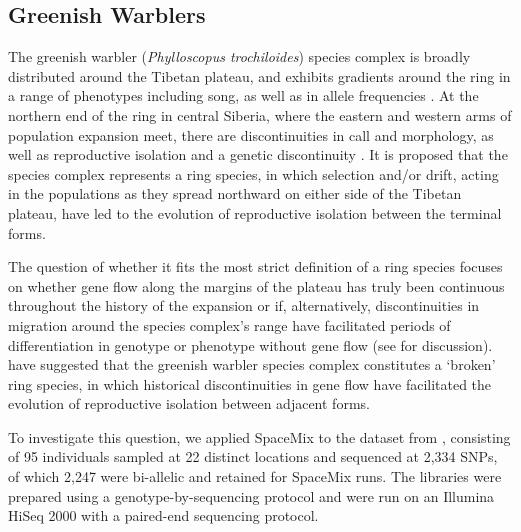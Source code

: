 \documentclass[12pt]{article}
\begin{document}
\subsection*{Greenish Warblers}  

The greenish warbler (\textit{Phylloscopus trochiloides}) species complex is broadly distributed around the Tibetan plateau, and exhibits gradients around the ring in a range of phenotypes including song, as well as in allele frequencies \citep{ticehurst1938, Irwin2001, Irwin2005}.  At the northern end of the ring in central Siberia, where the eastern and western arms of population expansion meet, there are discontinuities in call and morphology, as well as reproductive isolation and a genetic discontinuity \citep{Irwin2001, Irwin2008}. It is proposed that the species complex represents a ring species, in which selection and/or drift, acting in the populations as they spread northward on either side of the Tibetan plateau, have led to the evolution of reproductive isolation between the terminal forms.

The question of whether it fits the most strict definition of a ring species focuses on whether gene flow along the margins of the plateau has truly been continuous throughout the history of the expansion or if, alternatively, discontinuities in migration around the species complex's range have facilitated periods of differentiation in genotype or phenotype without gene flow \citep{Mayr1942, Mayr1970, coyne_orr_speciation} (see \citep{wake_schneider1998} for discussion). 
\citet{alcaide2014genomic} have suggested that the greenish warbler species complex constitutes a `broken' ring species, in which historical discontinuities in gene flow have facilitated the evolution of reproductive isolation between adjacent forms.  

To investigate this question, we applied SpaceMix to the dataset from \citet{alcaide2014genomic}, 
consisting of 95 individuals sampled at 22 distinct locations and sequenced at 2,334 SNPs, of which 2,247 were bi-allelic and retained for SpaceMix runs.
The libraries were prepared using a genotype-by-sequencing protocol and were run on an Illumina HiSeq 2000 with a paired-end sequencing protocol.
\end{document}

